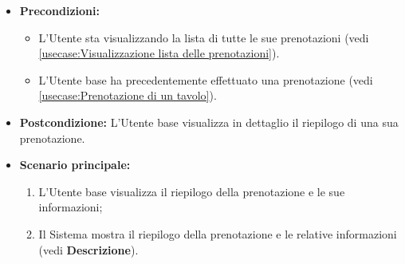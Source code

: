 \begin{itemize}
	\item \textbf{Precondizioni:}
	      \begin{itemize}
		      \item L'Utente sta visualizzando la lista di tutte le sue prenotazioni (vedi \autoref{usecase:Visualizzazione lista delle prenotazioni}).
		      \item L'Utente base ha precedentemente effettuato una prenotazione (vedi \autoref{usecase:Prenotazione di un tavolo}).
	      \end{itemize}


	\item \textbf{Postcondizione:}
	      L'Utente base visualizza in dettaglio il riepilogo di una sua prenotazione.

	\item \textbf{Scenario principale:}
	      \begin{enumerate}
		      \item L'Utente base visualizza il riepilogo della prenotazione e le sue informazioni;
		      \item Il Sistema mostra il riepilogo della prenotazione e le relative informazioni (vedi \textbf{Descrizione}).
	      \end{enumerate}
\end{itemize}
